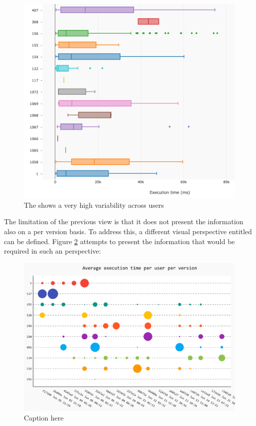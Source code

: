 \documentclass[conference]{IEEEtran}
\begin{document}
  \begin{figure}[!ht]
    \centering
    \includegraphics[width=\linewidth]{time_per_user}
    \caption{The \epFeedItems shows a very high variability across users}
    \label{fig:tpu}
  \end{figure}

  \niceseparator

  The limitation of the previous view is that it does not present the information also on a per version basis. To address this, a different visual perspective entitled  can be defined. Figure \ref{fig:tuv} attempts to present the information that would be required in such an perspective: 

  \begin{figure}[!ht]
    \centering
    \includegraphics[width=\linewidth]{time_per_user_per_version}
    \caption{Caption here}
    \label{fig:tuv}
  \end{figure}
\end{document}
